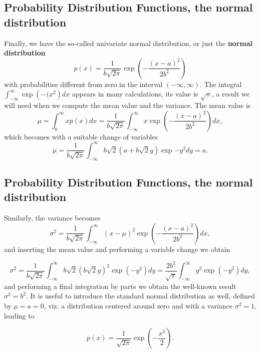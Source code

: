 \documentclass[%
oneside,                 %
final,                   %
10pt]{article}
\newenvironment{block_mdfboxadmon}[1][]{
\begin{block_mdfboxmdframed}[frametitle=#1]
}
{
\end{block_mdfboxmdframed}
}
\begin{document}
\subsection{Probability Distribution Functions, the normal distribution}

\begin{block_mdfboxadmon}[]
Finally, we have the so-called univariate normal  distribution, or just the \textbf{normal distribution}
\begin{equation*}    
p(x)=\frac{1}{b\sqrt{2\pi}}\exp{\left(-\frac{(x-a)^2}{2b^2}\right)}
\end{equation*}
with probabilities different from zero in the interval $(-\infty,\infty)$.
The integral $\int_{-\infty}^{\infty}\exp{\left(-(x^2\right)}dx$ appears in many calculations, its value
is $\sqrt{\pi}$,  a result we will need when we compute the mean value and the variance.
The mean value is
\begin{equation*}  
 \mu = \int_0^{\infty}xp(x)dx=\frac{1}{b\sqrt{2\pi}}\int_{-\infty}^{\infty}x \exp{\left(-\frac{(x-a)^2}{2b^2}\right)}dx,
\end{equation*}
which becomes with a suitable change of variables
\begin{equation*}  
 \mu =\frac{1}{b\sqrt{2\pi}}\int_{-\infty}^{\infty}b\sqrt{2}(a+b\sqrt{2}y)\exp{-y^2}dy=a.
\end{equation*}
\end{block_mdfboxadmon} %



\subsection{Probability Distribution Functions, the normal distribution}

\begin{block_mdfboxadmon}[]
Similarly, the variance becomes
\begin{equation*}  
 \sigma^2 = \frac{1}{b\sqrt{2\pi}}\int_{-\infty}^{\infty}(x-\mu)^2 \exp{\left(-\frac{(x-a)^2}{2b^2}\right)}dx,
\end{equation*}
and inserting the mean value and performing a variable change we obtain

\begin{equation*}  
 \sigma^2 = \frac{1}{b\sqrt{2\pi}}\int_{-\infty}^{\infty}b\sqrt{2}(b\sqrt{2}y)^2\exp{\left(-y^2\right)}dy=
\frac{2b^2}{\sqrt{\pi}}\int_{-\infty}^{\infty}y^2\exp{\left(-y^2\right)}dy,
\end{equation*}
and performing a final integration by parts we obtain the well-known result $\sigma^2=b^2$.
It is useful to introduce the standard normal distribution as well, defined by $\mu=a=0$, viz. a distribution
centered around zero and with a variance $\sigma^2=1$, leading to

\begin{equation}
   p(x)=\frac{1}{\sqrt{2\pi}}\exp{\left(-\frac{x^2}{2}\right)}.
\end{equation}
\end{block_mdfboxadmon} %
\end{document}
